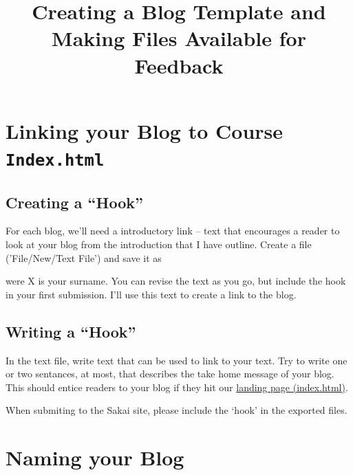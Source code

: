 \documentclass{article}\usepackage[]{graphicx}\usepackage[]{color}
\title{Creating a Blog Template and Making Files Available for Feedback}
\begin{document}
\maketitle



\section{Linking your Blog to Course \texttt{Index.html}}

\subsection{Creating a ``Hook''}

For each blog, we'll need a introductory link -- text that encourages a reader to look at your blog from the introduction that I have outline. Create a file ('File/New/Text File') and save it as 

\noindent were X is your surname. You can revise the text as you go, but include the hook in your first submission. I'll use this text to create a link to the blog. 

\subsection{Writing a ``Hook''}

In the text file, write text that can be used to link to your text. Try to write one or two sentances, at most, that describes the take home message of your blog. This should entice readers to your blog if they hit our \href{https://marclos.github.io/Climate_Change_Narratives/index.html}{landing page (index.html)}.



When submiting to the Sakai site, please include the `hook' in the exported files.  

\section{Naming your Blog}
\end{document}
